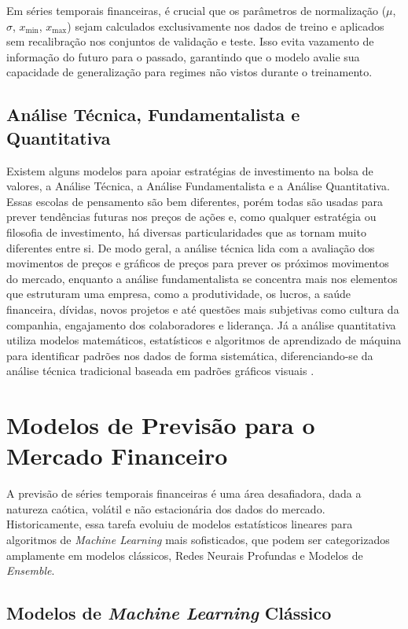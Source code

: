 Em séries temporais financeiras, é crucial que os parâmetros de normalização ($\mu$, $\sigma$, $x_{\min}$, $x_{\max}$) sejam calculados exclusivamente nos dados de treino e aplicados sem recalibração nos conjuntos de validação e teste. Isso evita vazamento de informação do futuro para o passado, garantindo que o modelo avalie sua capacidade de generalização para regimes não vistos durante o treinamento.

\subsection{Análise Técnica, Fundamentalista e Quantitativa}

Existem alguns modelos para apoiar estratégias de investimento na bolsa de valores, a Análise Técnica, a Análise Fundamentalista e a Análise Quantitativa. Essas escolas de pensamento são bem diferentes, porém todas são usadas para prever tendências futuras nos preços de ações e, como qualquer estratégia ou filosofia de investimento, há diversas particularidades que as tornam muito diferentes entre si. De modo geral, a análise técnica lida com a avaliação dos movimentos de preços e gráficos de preços para prever os próximos movimentos do mercado, enquanto a análise fundamentalista se concentra mais nos elementos que estruturam uma empresa, como a produtividade, os lucros, a saúde financeira, dívidas, novos projetos e até questões mais subjetivas como cultura da companhia, engajamento dos colaboradores e liderança. Já a análise quantitativa utiliza modelos matemáticos, estatísticos e algoritmos de aprendizado de máquina para identificar padrões nos dados de forma sistemática, diferenciando-se da análise técnica tradicional baseada em padrões gráficos visuais \cite{site8}.

\section{Modelos de Previsão para o Mercado Financeiro}

A previsão de séries temporais financeiras é uma área desafiadora, dada a natureza caótica, volátil e não estacionária dos dados do mercado. Historicamente, essa tarefa evoluiu de modelos estatísticos lineares para algoritmos de \textit{Machine Learning} mais sofisticados, que podem ser categorizados amplamente em modelos clássicos, Redes Neurais Profundas e Modelos de \textit{Ensemble}.

\subsection{Modelos de \textit{Machine Learning} Clássico}

